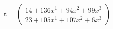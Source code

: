 \documentclass[preview]{standalone}
\begin{document}
\begin{align*}
\mathbf{t} = \begin{pmatrix}14 + 136x^{1} + 94x^{2} + 99x^{3} \\ 23 + 105x^{1} + 107x^{2} + 6x^{3}\end{pmatrix}
\end{align*}
\end{document}
